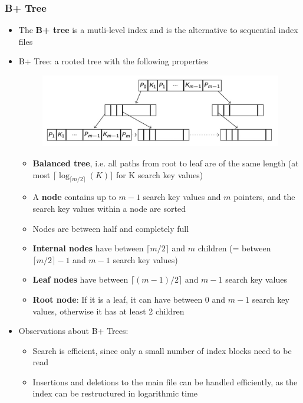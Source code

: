 \subsubsection{B+ Tree}
\begin{itemize}[label=\(\rhd\)]
    \item The \textbf{B+ tree} is a mutli-level index and is the alternative to sequential index files  
    \item B+ Tree: a rooted tree with the following properties
\begin{figure}[H]
    \centering
    \includegraphics[width=0.75\linewidth]{Screenshot 2024-05-22 at 15.43.01.jpg}
\end{figure}
\begin{itemize}[label=\(\rhd\)]
    \item \textbf{Balanced tree}, i.e. all paths from root to leaf are of the same length (at most $\lceil \log_{\lceil m/2\rceil}(K)\rceil$ for K search key values)
    \item A \textbf{node} contains up to $m-1$ search key values and $m$ pointers, and the search key values within a node are sorted
    \item Nodes are between half and completely full
    \item \textbf{Internal nodes} have between $\lceil m/2 \rceil$ and $m$ children (= between $\lceil m/2\rceil -1 $ and $m-1$ search key values)
    \item \textbf{Leaf nodes} have between $\lceil (m-1)/2 \rceil$ and $m-1$ search key values
    \item \textbf{Root node}: If it is a leaf, it can have between 0 and $m-1$ search key values, otherwise it has at least 2 children
\end{itemize}
\item Observations about B+ Trees:
\begin{itemize}[label=\(\rhd\)]
    \item Search is efficient, since only a small number of index blocks need to be read
    \item Insertions and deletions to the main file can be handled efficiently, as the index can be restructured in logarithmic time
\end{itemize}

\end{itemize}
